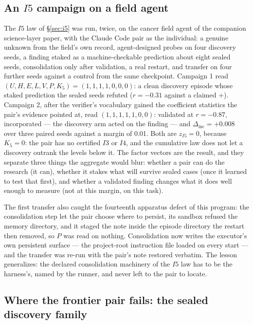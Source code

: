 \documentclass[11pt]{article}
\theoremstyle{definition}
\begin{document}
\subsection{An $I5$ campaign on a field agent}\label{sec:i5results}

The $I5$ law of \S\ref{sec:i5} was run, twice, on the cancer field agent of the companion science-layer paper, with the Claude Code pair as the individual: a genuine unknown from the field's own record, agent-designed probes on four discovery seeds, a finding staked as a machine-checkable prediction about eight sealed seeds, consolidation only after validation, a real restart, and transfer on four further seeds against a control from the same checkpoint. Campaign 1 read $(U,H,E,L,V,P,K_5) = (1,1,1,1,0,0,0)$: a clean discovery episode whose staked prediction the sealed seeds refuted ($r = -0.31$ against a claimed $+$). Campaign 2, after the verifier's vocabulary gained the coefficient statistics the pair's evidence pointed at, read $(1,1,1,1,1,0,0)$: validated at $r = -0.87$, incorporated --- the discovery arm acted on the finding --- and $\Delta_{\mathrm{inc}} = +0.008$ over three paired seeds against a margin of 0.01. Both are $z_{I5} = 0$, because $K_5 = 0$: the pair has no certified $I3$ or $I4$, and the cumulative law does not let a discovery outrank the levels below it. The factor vectors are the result, and they separate three things the aggregate would blur: whether a pair can do the research (it can), whether it stakes what will survive sealed cases (once it learned to test that first), and whether a validated finding changes what it does well enough to measure (not at this margin, on this task).

The first transfer also caught the fourteenth apparatus defect of this program: the consolidation step let the pair choose where to persist, its sandbox refused the memory directory, and it staged the note inside the episode directory the restart then removed, so $P$ was read on nothing. Consolidation now writes the executor's own persistent surface --- the project-root instruction file loaded on every start --- and the transfer was re-run with the pair's note restored verbatim. The lesson generalizes: the declared consolidation machinery of the $I5$ law has to be the harness's, named by the runner, and never left to the pair to locate.

\subsection{Where the frontier pair fails: the sealed discovery family}
\end{document}

